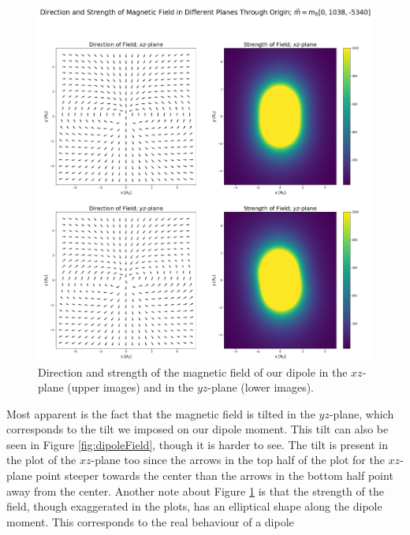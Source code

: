 \begin{figure}[ht]
    \centering
    \includegraphics[scale=.28]{Images/dipolePlanes.png}
    \caption{Direction and strength of the magnetic field of our dipole in the $xz$-plane (upper images) and in the $yz$-plane (lower images).}
    \label{fig:dipolePlanes}
\end{figure}

\noindent Most apparent is the fact that the magnetic field is tilted in the $yz$-plane, which corresponds to the tilt we imposed on our dipole moment. This tilt can also be seen in Figure \ref{fig:dipoleField}, though it is harder to see. The tilt is present in the plot of the $xz$-plane too since the arrows in the top half of the plot for the $xz$-plane point steeper towards the center than the arrows in the bottom half point away from the center. Another note about Figure \ref{fig:dipolePlanes} is that the strength of the field, though exaggerated in the plots, has an elliptical shape along the dipole moment. This corresponds to the real behaviour of a dipole